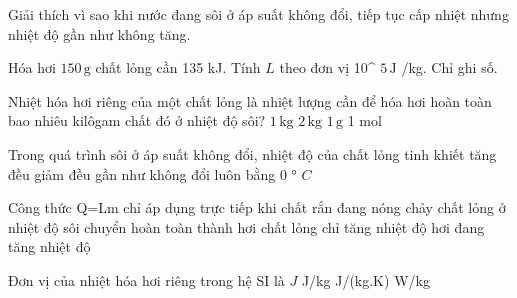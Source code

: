 \begin{bt}
Giải thích vì sao khi nước đang sôi ở áp suất không đổi, tiếp tục cấp nhiệt nhưng nhiệt độ gần như không tăng.
\end{bt}

\begin{ex}
Hóa hơi $150\,\text{g}$ chất lỏng cần 135 kJ. Tính $L$ theo đơn vị 10^ $5\,\text{J}$ /kg. Chỉ ghi số.
\end{ex}

\begin{ex}
Nhiệt hóa hơi riêng của một chất lỏng là nhiệt lượng cần để hóa hơi hoàn toàn bao nhiêu kilôgam chất đó ở nhiệt độ sôi?
\choice
{\True $1\,\text{kg}$}
{$2\,\text{kg}$}
{$1\,\text{g}$}
{1 mol}
\end{ex}

\begin{ex}
Trong quá trình sôi ở áp suất không đổi, nhiệt độ của chất lỏng tinh khiết
\choice
{tăng đều}
{giảm đều}
{\True gần như không đổi}
{luôn bằng 0 ° $C$}
\end{ex}

\begin{ex}
Công thức Q=Lm chỉ áp dụng trực tiếp khi
\choice
{chất rắn đang nóng chảy}
{\True chất lỏng ở nhiệt độ sôi chuyển hoàn toàn thành hơi}
{chất lỏng chỉ tăng nhiệt độ}
{hơi đang tăng nhiệt độ}
\end{ex}

\begin{ex}
Đơn vị của nhiệt hóa hơi riêng trong hệ SI là
\choice
{$J$}
{\True J/kg}
{J/(kg.K)}
{W/kg}
\end{ex}

